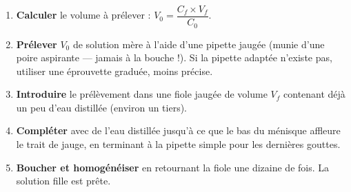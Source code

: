 \documentclass[11pt]{article}
\begin{document}
\begin{methode}
\begin{enumerate}
\item \textbf{Calculer} le volume à prélever : $V_0 = \dfrac{C_f \times V_f}{C_0}$.
\item \textbf{Prélever} $V_0$ de solution mère à l'aide d'une pipette jaugée (munie d'une poire aspirante — jamais à la bouche !). Si la pipette adaptée n'existe pas, utiliser une éprouvette graduée, moins précise.
\item \textbf{Introduire} le prélèvement dans une fiole jaugée de volume $V_f$ contenant déjà un peu d'eau distillée (environ un tiers).
\item \textbf{Compléter} avec de l'eau distillée jusqu'à ce que le bas du ménisque affleure le trait de jauge, en terminant à la pipette simple pour les dernières gouttes.
\item \textbf{Boucher et homogénéiser} en retournant la fiole une dizaine de fois. La solution fille est prête.
\end{enumerate}
\end{methode}
\end{document}
